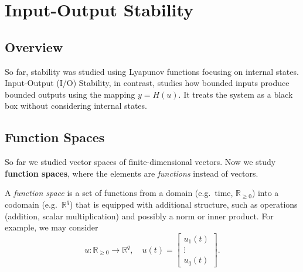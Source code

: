 \chapterspaceabove{6.75cm} %
\chapterspacebelow{7.25cm} %

\chapter{Input-Output Stability}

\section{Overview}

So far, stability was studied using Lyapunov functions focusing on internal states. Input-Output (I/O) Stability, in contrast, studies how bounded inputs produce bounded outputs using the mapping $y = H(u)$. It treats the system as a black box without considering internal states.  

\begin{center}
\end{center}

\section{Function Spaces}

So far we studied vector spaces of finite-dimensional vectors.  
Now we study \textbf{function spaces}, where the elements are \emph{functions} instead of vectors.  

\begin{definition}
A \emph{function space} is a set of functions from a domain (e.g.\ time, $\mathbb{R}_{\geq 0}$) into a codomain (e.g.\ $\mathbb{R}^q$) that is equipped with additional structure, such as operations (addition, scalar multiplication) and possibly a norm or inner product.  
For example, we may consider
\[
u:\mathbb{R}_{\geq 0} \to \mathbb{R}^q, 
\quad 
u(t) =
\begin{bmatrix}
u_1(t) \\ \vdots \\ u_q(t)
\end{bmatrix}.
\]
\end{definition}

